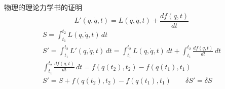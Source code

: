 \documentclass[12pt, a4paper, oneside, UTF8]{ctexbook}  %
\begin{document}
\begin{add}
    物理的理论力学书的证明
    \[L'(q, \dot{q}, t) = L(q, \dot{q}, t) + \frac{df(q, t)}{dt}\]
    \begin{gather*}
        S = \int_{t_1}^{t_2} L(q, \dot{q}, t) \, dt \\
        S' = \int_{t_1}^{t_2} L'(q, \dot{q}, t) \, dt 
        = \int_{t_1}^{t_2} L(q, \dot{q}, t) \, dt + \int_{t_1}^{t_2} \frac{df(q, t)}{dt} \, dt \\
        \int_{t_1}^{t_2} \frac{df(q, t)}{dt} \, dt = f(q(t_2), t_2) - f(q(t_1), t_1) \\
        S' = S + f(q(t_2), t_2) - f(q(t_1), t_1) \qquad
        \delta S' = \delta S
    \end{gather*}
\end{add}













\ifx\allfiles\undefined
\end{document}
